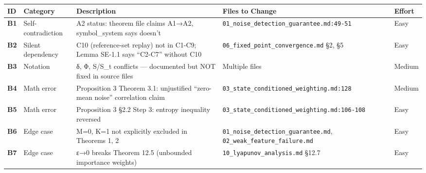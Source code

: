 \documentclass[
  12pt,
]{ctexart}
\begin{document}
\begin{longtable}[]{@{}
  >{\raggedright\arraybackslash}p{}
  >{\raggedright\arraybackslash}p{}
  >{\raggedright\arraybackslash}p{}
  >{\raggedright\arraybackslash}p{}
  >{\raggedright\arraybackslash}p{}@{}}
\toprule\noalign{}
\begin{minipage}[b]{\linewidth}\raggedright
ID
\end{minipage} & \begin{minipage}[b]{\linewidth}\raggedright
Category
\end{minipage} & \begin{minipage}[b]{\linewidth}\raggedright
Description
\end{minipage} & \begin{minipage}[b]{\linewidth}\raggedright
Files to Change
\end{minipage} & \begin{minipage}[b]{\linewidth}\raggedright
Effort
\end{minipage} \\
\midrule\noalign{}
\endhead
\bottomrule\noalign{}
\endlastfoot
\textbf{B1} & Self-contradiction & A2 status: theorem file claims A1→A2,
symbol\_system says doesn't &
\texttt{01\_noise\_detection\_guarantee.md:49-51} & Easy \\
\textbf{B2} & Silent dependency & C10 (reference-set replay) not in
C1-C9; Lemma SE-1.1 says ``C2-C7'' without C10 &
\texttt{06\_fixed\_point\_convergence.md} §2, §5 & Easy \\
\textbf{B3} & Notation & δ, Φ, S/S\_t conflicts --- documented but NOT
fixed in source files & Multiple files & Medium \\
\textbf{B4} & Math error & Proposition 3 Theorem 3.1: unjustified
``zero-mean noise'' correlation claim &
\texttt{03\_state\_conditioned\_weighting.md:128} & Medium \\
\textbf{B5} & Math error & Proposition 3 §2.2 Step 3: entropy inequality
reversed & \texttt{03\_state\_conditioned\_weighting.md:106-108} &
Easy \\
\textbf{B6} & Edge case & M=0, K=1 not explicitly excluded in Theorems
1, 2 & \texttt{01\_noise\_detection\_guarantee.md},
\texttt{02\_weak\_feature\_failure.md} & Easy \\
\textbf{B7} & Edge case & ε→0 breaks Theorem 12.5 (unbounded importance
weights) & \texttt{10\_lyapunov\_analysis.md} §12.7 & Easy \\

\end{longtable}
\end{document}
